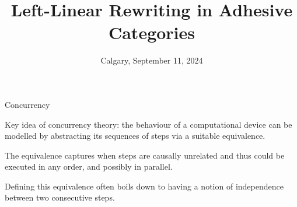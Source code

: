 \documentclass[usenames,dvipsnames]{beamer}
\title{Left-Linear Rewriting in Adhesive Categories}
\date[May 1977]{Calgary, September 11, 2024}
\begin{document}
	\maketitle 


\begin{frame}{Concurrency}\justifying
	

	
	Key  idea of concurrency theory:  the behaviour of a computational
	device can be modelled by abstracting its sequences of steps via a suitable equivalence.
	
	\pause 
	\medskip 
	The equivalence captures when steps are causally unrelated and thus could be
	executed in any order, and possibly in parallel.
	
	\pause 
	\medskip 
	Defining this equivalence often boils down to having a notion
	of independence between two consecutive steps. 
	
	
\end{frame}
\end{document}
